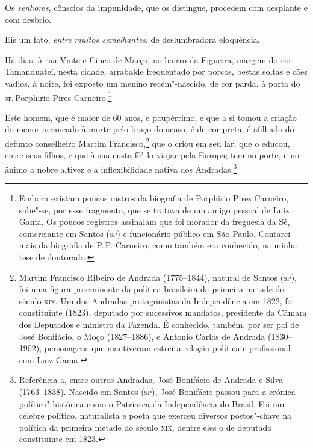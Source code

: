
Os \emph{senhores}, cônscios da impunidade, que os distingue, procedem
com desplante e com desbrio.

Eis um fato, \emph{entre muitos semelhantes}, de deslumbradora
eloquência.

Há dias, à rua Vinte e Cinco de Março, no bairro da Figueira, margem do
rio Tamanduateí, nesta cidade, arrabalde frequentado por porcos, bestas
soltas e cães vadios, à noite, foi exposto um menino recém"-nascido, de
cor parda, à porta do sr.\,Porphirio Pires Carneiro.\footnote{Embora
  existam poucos rastros da biografia de Porphirio Pires Carneiro,
  sabe"-se, por esse fragmento, que se tratava de um amigo pessoal de
  Luiz Gama. Os poucos registros assinalam que foi morador da
  freguesia da Sé, comerciante em Santos (\textsc{sp}) e funcionário público em
  São Paulo. Contarei mais da biografia de P.\,P. Carneiro, como também
  era conhecido, na minha tese de doutorado.}

Este homem, que é maior de 60 anos, e paupérrimo, e que a si tomou a
criação do menor arrancado à morte pelo braço do acaso, é de cor preta,
é afilhado do defunto conselheiro Martim Francisco,\footnote{Martim
  Francisco Ribeiro de Andrada (1775--1844), natural de Santos (\textsc{sp}), foi
  uma figura proeminente da política brasileira da primeira metade do
  século \textsc{xix}. Um dos Andradas protagonistas da Independência em 1822,
  foi constituinte (1823), deputado por sucessivos mandatos, presidente
  da Câmara dos Deputados e ministro da Fazenda. É conhecido, também,
  por ser pai de José Bonifácio, o Moço (1827--1886), e Antonio Carlos de
  Andrada (1830--1902), personagens que mantiveram estreita relação
  política e profissional com Luiz Gama.} que o criou em seu lar, que o
educou, entre seus filhos, e que à sua custa fê"-lo viajar pela Europa;
tem no porte, e no ânimo a nobre altivez e a inflexibilidade nativa dos
Andradas.\footnote{Referência a, entre outros Andradas, José Bonifácio
  de Andrada e Silva (1763--1838). Nascido em Santos (\textsc{sp}), José Bonifácio
  passou para a crônica político"-histórica como o Patriarca da
  Independência do Brasil. Foi um célebre político, naturalista e poeta
  que exerceu diversos postos"-chave na política da primeira metade do
  século \textsc{xix}, dentre eles o de deputado constituinte em 1823.}

